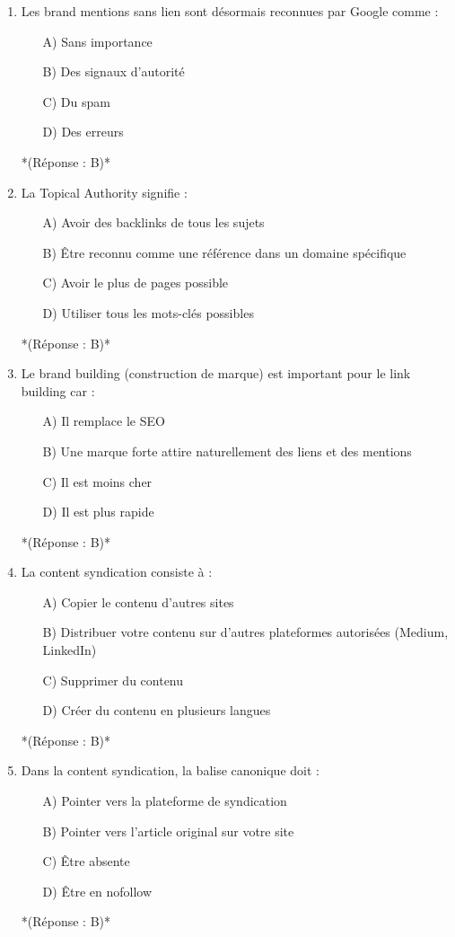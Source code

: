 \documentclass[12pt,a4paper,twoside]{report}
\begin{document}
\begin{enumerate}
\item Les brand mentions sans lien sont désormais reconnues par Google comme :
\begin{itemize}
\item[A)] Sans importance
\item[B)] Des signaux d'autorité
\item[C)] Du spam
\item[D)] Des erreurs
\end{itemize}
*(Réponse : B)*

\item La Topical Authority signifie :
\begin{itemize}
\item[A)] Avoir des backlinks de tous les sujets
\item[B)] Être reconnu comme une référence dans un domaine spécifique
\item[C)] Avoir le plus de pages possible
\item[D)] Utiliser tous les mots-clés possibles
\end{itemize}
*(Réponse : B)*

\item Le brand building (construction de marque) est important pour le link building car :
\begin{itemize}
\item[A)] Il remplace le SEO
\item[B)] Une marque forte attire naturellement des liens et des mentions
\item[C)] Il est moins cher
\item[D)] Il est plus rapide
\end{itemize}
*(Réponse : B)*

\item La content syndication consiste à :
\begin{itemize}
\item[A)] Copier le contenu d'autres sites
\item[B)] Distribuer votre contenu sur d'autres plateformes autorisées (Medium, LinkedIn)
\item[C)] Supprimer du contenu
\item[D)] Créer du contenu en plusieurs langues
\end{itemize}
*(Réponse : B)*

\item Dans la content syndication, la balise canonique doit :
\begin{itemize}
\item[A)] Pointer vers la plateforme de syndication
\item[B)] Pointer vers l'article original sur votre site
\item[C)] Être absente
\item[D)] Être en nofollow
\end{itemize}
*(Réponse : B)*


\end{enumerate}
\end{document}
